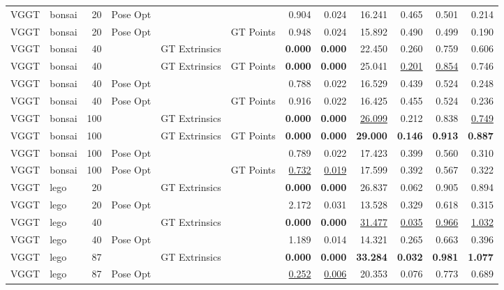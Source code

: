 \begin{table}[H]
\begin{tabular}{llrlllrrrrrr}
VGGT & bonsai & 20 & Pose Opt &  &  & 0.904 & 0.024 & 16.241 & 0.465 & 0.501 & 0.214 \\
VGGT & bonsai & 20 & Pose Opt &  & GT Points & 0.948 & 0.024 & 15.892 & 0.490 & 0.499 & 0.190 \\
VGGT & bonsai & 40 &  & GT Extrinsics &  & \textbf{0.000} & \textbf{0.000} & 22.450 & 0.260 & 0.759 & 0.606 \\
VGGT & bonsai & 40 &  & GT Extrinsics & GT Points & \textbf{0.000} & \textbf{0.000} & 25.041 & \underline{0.201} & \underline{0.854} & 0.746 \\
VGGT & bonsai & 40 & Pose Opt &  &  & 0.788 & 0.022 & 16.529 & 0.439 & 0.524 & 0.248 \\
VGGT & bonsai & 40 & Pose Opt &  & GT Points & 0.916 & 0.022 & 16.425 & 0.455 & 0.524 & 0.236 \\
VGGT & bonsai & 100 &  & GT Extrinsics &  & \textbf{0.000} & \textbf{0.000} & \underline{26.099} & 0.212 & 0.838 & \underline{0.749} \\
VGGT & bonsai & 100 &  & GT Extrinsics & GT Points & \textbf{0.000} & \textbf{0.000} & \textbf{29.000} & \textbf{0.146} & \textbf{0.913} & \textbf{0.887} \\
VGGT & bonsai & 100 & Pose Opt &  &  & 0.789 & 0.022 & 17.423 & 0.399 & 0.560 & 0.310 \\
VGGT & bonsai & 100 & Pose Opt &  & GT Points & \underline{0.732} & \underline{0.019} & 17.599 & 0.392 & 0.567 & 0.322 \\
\midrule
VGGT & lego & 20 &  & GT Extrinsics &  & \textbf{0.000} & \textbf{0.000} & 26.837 & 0.062 & 0.905 & 0.894 \\
VGGT & lego & 20 & Pose Opt &  &  & 2.172 & 0.031 & 13.528 & 0.329 & 0.618 & 0.315 \\
VGGT & lego & 40 &  & GT Extrinsics &  & \textbf{0.000} & \textbf{0.000} & \underline{31.477} & \underline{0.035} & \underline{0.966} & \underline{1.032} \\
VGGT & lego & 40 & Pose Opt &  &  & 1.189 & 0.014 & 14.321 & 0.265 & 0.663 & 0.396 \\
VGGT & lego & 87 &  & GT Extrinsics &  & \textbf{0.000} & \textbf{0.000} & \textbf{33.284} & \textbf{0.032} & \textbf{0.981} & \textbf{1.077} \\
VGGT & lego & 87 & Pose Opt &  &  & \underline{0.252} & \underline{0.006} & 20.353 & 0.076 & 0.773 & 0.689 \\
\bottomrule
\end{tabular}
\end{table}